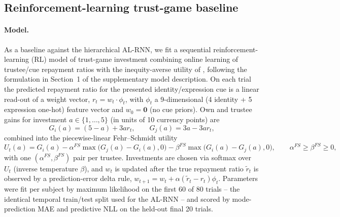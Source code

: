 \documentclass[11pt]{article}
\begin{document}
\subsection*{Reinforcement-learning trust-game baseline}

\paragraph{Model.}
As a baseline against the hierarchical AL-RNN, we fit a sequential
reinforcement-learning (RL) model of trust-game investment combining online
learning of trustee/cue repayment ratios with the inequity-averse utility of
\citet{FehrSchmidt1999}, following the formulation in Section~1 of the
supplementary model description. On each trial the predicted repayment
ratio for the presented identity/expression cue is a linear read-out of a
weight vector, $r_t = w_t \cdot \phi_t$, with $\phi_t$ a 9-dimensional (4
identity + 5 expression one-hot) feature vector and $w_0 = \mathbf{0}$ (no
cue priors). Own and trustee gains for investment $a \in \{1,\dots,5\}$
(in units of 10 currency points) are
\begin{equation}
  G_i(a) = (5-a) + 3ar_t, \qquad G_j(a) = 3a - 3ar_t,
\end{equation}
combined into the piecewise-linear Fehr--Schmidt utility
\begin{equation}
  U_t(a) = G_i(a) - \alpha^{FS}\max\!\big(G_j(a)-G_i(a),0\big)
                    - \beta^{FS}\max\!\big(G_i(a)-G_j(a),0\big),
  \qquad \alpha^{FS} \ge \beta^{FS} \ge 0,
\end{equation}
with one $(\alpha^{FS},\beta^{FS})$ pair per trustee. Investments are chosen
via softmax over $U_t$ (inverse temperature $\beta$), and $w_t$ is updated
after the true repayment ratio $\tilde r_t$ is observed by a
prediction-error delta rule, $w_{t+1} = w_t + \alpha(\tilde r_t - r_t)\phi_t$.
Parameters were fit per subject by maximum likelihood on the first 60 of 80
trials -- the identical temporal train/test split used for the AL-RNN --
and scored by mode-prediction MAE and predictive NLL on the held-out final
20 trials.
\end{document}
